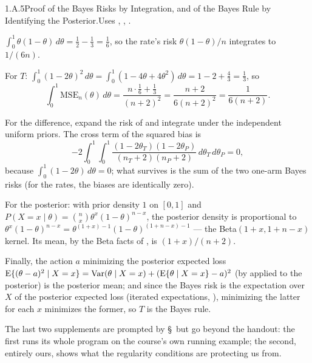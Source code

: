 \documentclass[main.tex]{subfiles}
\begin{document}
\begin{Prf}{1.A.5}{Proof of the Bayes Risks by Integration, and of the Bayes Rule by Identifying the Posterior.}{Uses , , .}
\item $\int_0^1\theta(1-\theta)\,d\theta=\tfrac12-\tfrac13=\tfrac16$, so the rate's risk
      $\theta(1-\theta)/n$ integrates to $1/(6n)$.
\item For $T$: $\int_0^1(1-2\theta)^2\,d\theta=\int_0^1(1-4\theta+4\theta^2)\,d\theta
      =1-2+\tfrac43=\tfrac13$, so
      \[ \int_0^1 \mathrm{MSE}_n(\theta)\,d\theta
      =\frac{n\cdot\frac16+\frac13}{(n+2)^2}
      =\frac{n+2}{6(n+2)^2}=\frac{1}{6(n+2)} . \]
\item For the difference, expand the risk of  and integrate under the independent
      uniform priors. The cross term of the squared bias is
      \[ -2\int_0^1\!\!\int_0^1 \frac{(1-2\theta_T)(1-2\theta_P)}{(n_T+2)(n_P+2)}
      \,d\theta_T\,d\theta_P=0, \]
      because $\int_0^1(1-2\theta)\,d\theta=0$; what survives is the
      sum of the two one-arm Bayes risks (for the rates, the biases are identically zero).
\item For the posterior: with prior density $1$ on $[0,1]$ and $P(X=x\mid\theta)
      =\binom{n}{x}\theta^x(1-\theta)^{n-x}$, the posterior density is proportional to
      $\theta^{x}(1-\theta)^{n-x}=\theta^{(1+x)-1}(1-\theta)^{(1+n-x)-1}$ --- the
      Beta$(1+x,1+n-x)$ kernel. Its mean, by the Beta facts of , is
      $(1+x)/(n+2)$.
\item Finally, the action $a$ minimizing the posterior expected loss
      $\mathrm{E}\{(\theta-a)^2\mid X=x\}=\operatorname{Var}(\theta\mid X=x)+(\mathrm{E}\{\theta\mid X=x\}-a)^2$
      (by  applied to the posterior) is the posterior mean; and since the Bayes
      risk is the expectation over $X$ of the posterior expected loss (iterated expectations,
      ), minimizing the latter for each $x$ minimizes the former, so $T$ is the
      Bayes rule.
\end{Prf}

\medskip
The last two supplements are prompted by \S\, but go beyond the handout: the first
runs its whole program on the course's own running example; the second, entirely ours, shows
what the regularity conditions are protecting us from.
\end{document}
